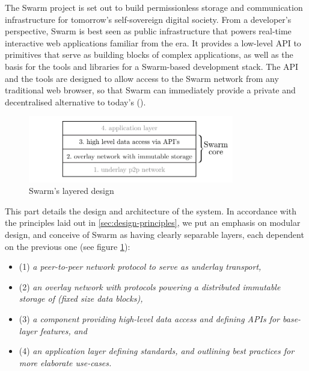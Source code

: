
\green{}

The Swarm project is set out to build permissionless storage and communication infrastructure for tomorrow's self-sovereign digital society. From a developer's perspective, Swarm is best seen as public infrastructure that powers real-time interactive web applications familiar from the  era. It provides a low-level API to primitives that serve as building blocks of complex applications, as well as the basis for the tools and libraries for a Swarm-based  development stack. The API and the tools are designed to allow access to the Swarm network from any traditional web browser, so that Swarm can immediately provide a private and decentralised alternative to today's  ().

\begin{figure}[htbp]
  \centering
    \includegraphics[width=0.8\textwidth]{fig/swarm-layered-design.pdf}
  \caption[Swarm's layered design \statusgreen]{Swarm's layered design}
\label{fig:Swarm-layered-design}
\end{figure}

This part details the design and architecture of the system. In accordance with the principles laid out in \ref{sec:design-principles}, we put an emphasis on modular design, and conceive of Swarm as having clearly separable layers, each dependent on the previous one (see figure \ref{fig:Swarm-layered-design}):

\begin{itemize}
\item (1) \emph{a peer-to-peer network protocol to serve as underlay transport,}
\item (2) \emph{an overlay network with protocols powering a distributed immutable storage of  (fixed size data blocks),}
\item (3) \emph{a component providing high-level data access and defining APIs for base-layer features, and}
\item (4) \emph{an application layer defining standards, and outlining best practices for more elaborate use-cases.}
\end{itemize}

